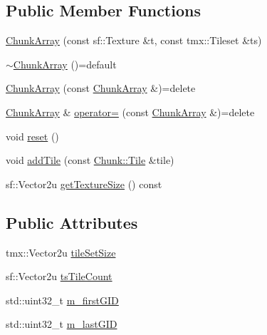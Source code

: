 \subsection*{Public Member Functions}
\begin{DoxyCompactItemize}
\item 
\hyperlink{classMapLayer_1_1Chunk_1_1ChunkArray_a566f7f2c8c1fd2405ed8a359a9cf8717}{Chunk\+Array} (const sf\+::\+Texture \&t, const tmx\+::\+Tileset \&ts)
\item 
\hyperlink{classMapLayer_1_1Chunk_1_1ChunkArray_a032e0fa8a35d86815109eb0e1296c567}{$\sim$\+Chunk\+Array} ()=default
\item 
\hyperlink{classMapLayer_1_1Chunk_1_1ChunkArray_a85a82c50eae1a835b7a355813b560cbf}{Chunk\+Array} (const \hyperlink{classMapLayer_1_1Chunk_1_1ChunkArray}{Chunk\+Array} \&)=delete
\item 
\hyperlink{classMapLayer_1_1Chunk_1_1ChunkArray}{Chunk\+Array} \& \hyperlink{classMapLayer_1_1Chunk_1_1ChunkArray_ad5c7843e61bbddfb1be30ec93d75510f}{operator=} (const \hyperlink{classMapLayer_1_1Chunk_1_1ChunkArray}{Chunk\+Array} \&)=delete
\item 
void \hyperlink{classMapLayer_1_1Chunk_1_1ChunkArray_a4f93efce951889766d0336525e697cdd}{reset} ()
\item 
void \hyperlink{classMapLayer_1_1Chunk_1_1ChunkArray_a5d3cc7cca03c66402b6a73978e1440dc}{add\+Tile} (const \hyperlink{classMapLayer_1_1Chunk_a2137a288bfd4120eb3e4db5934b802f3}{Chunk\+::\+Tile} \&tile)
\item 
sf\+::\+Vector2u \hyperlink{classMapLayer_1_1Chunk_1_1ChunkArray_a6de1bdb0370138d0b63b8817da6fb2a2}{get\+Texture\+Size} () const
\end{DoxyCompactItemize}
\subsection*{Public Attributes}
\begin{DoxyCompactItemize}
\item 
tmx\+::\+Vector2u \hyperlink{classMapLayer_1_1Chunk_1_1ChunkArray_a2338cdb0f900b21dd175ac86f7d4d984}{tile\+Set\+Size}
\item 
sf\+::\+Vector2u \hyperlink{classMapLayer_1_1Chunk_1_1ChunkArray_a2248df4d35f691b2b2afe3aeb02f50ed}{ts\+Tile\+Count}
\item 
std\+::uint32\+\_\+t \hyperlink{classMapLayer_1_1Chunk_1_1ChunkArray_a5f4d6066ddf867552b992d8215fbffcb}{m\+\_\+first\+G\+ID}
\item 
std\+::uint32\+\_\+t \hyperlink{classMapLayer_1_1Chunk_1_1ChunkArray_a02890e0578dbc2550e74ac1734b6c608}{m\+\_\+last\+G\+ID}
\end{DoxyCompactItemize}
